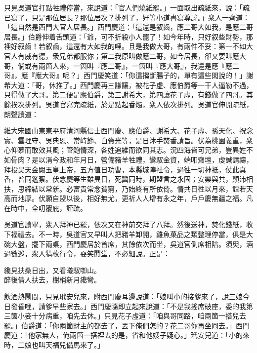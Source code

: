 只見吳道官打點牲禮停當，來說道：「官人們燒紙罷。」一面取出疏紙來，說：「疏已寫了，只是那位居長？那位居次？排列了，好等小道書寫尊諱。」衆人一齊道：「這自然是西門大官人居長。」{}西門慶道：「這還是叙齒，應二哥大如我，是應二哥居長。」伯爵伸着舌頭道：「爺，可不折殺小人罷了！{}如今年時，只好叙些財勢，那裡好叙齒！{}若叙齒，這還有大如我的哩。且是我做大哥，有兩件不妥：第一不如大官人有威有德，{}衆兄弟都服你；第二我原叫做應二哥，如今居長，卻又要叫應大哥，倘或有兩箇人來，一箇叫『應二哥』，一箇叫『應大哥』，我還是應『應二哥』，應『應大哥』呢？」西門慶笑道：「你這搊斷腸子的，單有這些閑說的！」謝希大道：「哥，休推了。」西門慶再三謙讓，被花子虛、應伯爵等一干人逼勒不過，只得做了大哥。第二便是應伯爵，第三謝希大，第四讓花子虛，有錢做了四哥。其餘挨次排列。吳道官寫完疏紙，於是點起香燭，衆人依次排列。吳道官伸開疏紙，朗聲讀道：

\begin{myquote}[\markfont]
維大宋國山東東平府清河縣信士西門慶、應伯爵、謝希大、花子虛、孫天化、祝念實、雲理守、吳典恩、常峙節、白賚光等，是日沐手焚香請旨。伏為桃園義重，衆心仰慕而敢效其風；管鮑情深，各姓追維而欲同其志。況四海皆可兄弟，豈異姓不如骨肉？是以涓今政和年月日，營備豬羊牲禮，鸞馭金資，端叩齋壇，虔誠請禱，拜投昊天金闕玉皇上帝，五方值日功曹，本縣城隍社令，過徃一切神衹，仗此真香，普同鑑察。伏念慶等生雖異日，死冀同時，期盟言之永固；安樂與共，顛沛相扶，思締結以常新。必富貴常念貧窮，乃始終有所依倚。情共日徃以月來，誼若天高而地厚。伏願自盟以後，相好無尤，更祈人人增有永之年，戶戶慶無疆之福。凡在時中，全叨覆庇，謹疏。

\end{myquote}

吳道官讀畢，衆人拜神已罷，依次又在神前交拜了八拜。然後送神，焚化錢紙，收下福禮去。不一時，吳道官又早叫人把豬羊卸開，雞魚菓品之類整理停當，俱是大碗大盤，擺下兩桌，西門慶居於首席，其餘依次而坐，吳道官側席相陪。須臾，酒過數巡，衆人猜枚行令，耍笑鬨堂，不必細說。正是：

\begin{myquote}
纔見扶桑日出，又看曦馭啣山。\\
醉後倩人扶去，樹梢新月纔彎。
\end{myquote}

飲酒熱鬧間，只見玳安兒來，附西門慶耳邊說道：「娘叫小的接爹來了，說三娘今日發昏哩，請爹早些家去。」西門慶隨即立起來說道：「不是我搖席破座，委的我第三箇小妾十分病重，咱先去休。」只見花子虛道：「咱與哥同路，咱兩箇一搭兒去罷。」伯爵道：「你兩箇財主的都去了，{}丟下俺們怎的？花二哥你再坐囘去。」西門慶道：「他家無人，俺兩箇一搭裡去的是，省和他嫂子疑心。」玳安兒道：「小的來時，二娘也叫天福兒備馬來了。」

